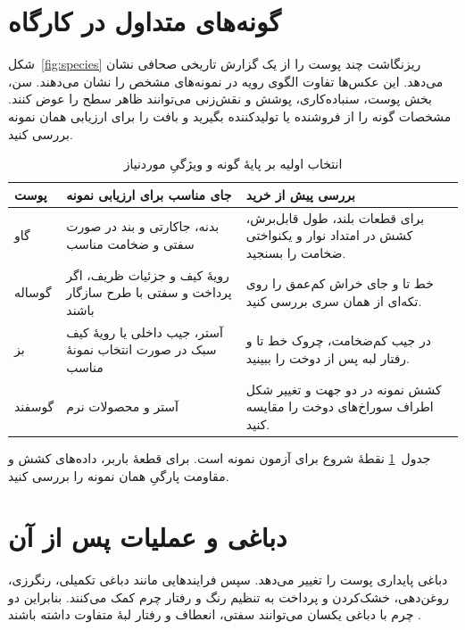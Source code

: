 \section{گونه‌های متداول در کارگاه}

شکل~\ref{fig:species} ریزنگاشت چند پوست را از یک گزارش تاریخی صحافی نشان می‌دهد. این عکس‌ها تفاوت الگوی رویه در نمونه‌های مشخص را نشان می‌دهند. سن، بخش پوست، سنباده‌کاری، پوشش و نقش‌زنی می‌توانند ظاهر سطح را عوض کنند. مشخصات گونه را از فروشنده یا تولیدکننده بگیرید و بافت را برای ارزیابی همان نمونه بررسی کنید.


\begin{table}[!htbp]
  \centering
  \caption{انتخاب اولیه بر پایۀ گونه و ویژگیِ موردنیاز}
  \label{tab:species}
  \begin{tabular}{@{}p{24mm}p{60mm}p{62mm}@{}}
    \toprule
    پوست & جای مناسب برای ارزیابی نمونه & بررسی پیش از خرید \\
    \midrule
    گاو & بدنه، جاکارتی و بند در صورت سفتی و ضخامت مناسب & برای قطعات بلند، طول قابل‌برش، کشش در امتداد نوار و یکنواختی ضخامت را بسنجید. \\
    گوساله & رویۀ کیف و جزئیات ظریف، اگر پرداخت و سفتی با طرح سازگار باشند & خط تا و جای خراش کم‌عمق را روی تکه‌ای از همان سری بررسی کنید. \\
    بز & آستر، جیب داخلی یا رویۀ کیف سبک در صورت انتخاب نمونۀ مناسب & در جیب کم‌ضخامت، چروک خط تا و رفتار لبه پس از دوخت را ببینید. \\
    گوسفند & آستر و محصولات نرم & کشش نمونه در دو جهت و تغییر شکل اطراف سوراخ‌های دوخت را مقایسه کنید. \\
    \bottomrule
  \end{tabular}
\end{table}

جدول~\ref{tab:species} نقطۀ شروع برای آزمون نمونه است. برای قطعۀ باربر، داده‌های کشش و مقاومت پارگیِ همان نمونه را بررسی کنید.

\section{دباغی و عملیات پس از آن}

دباغی پایداری پوست را تغییر می‌دهد. سپس فرایندهایی مانند دباغی تکمیلی، رنگرزی، روغن‌دهی، خشک‌کردن و پرداخت به تنظیم رنگ و رفتار چرم کمک می‌کنند. بنابراین دو چرم با دباغی یکسان می‌توانند سفتی، انعطاف و رفتار لبۀ متفاوت داشته باشند \cite{jrc}.

